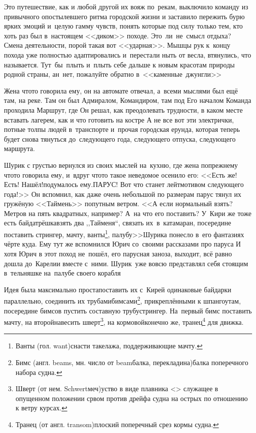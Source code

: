 {Это путешествие, как и любой другой их вояж по~рекам, выключило команду из привычного опостылевшего ритма городской жизни и заставило пережить бурю ярких эмоций и~целую гамму чувств, понять которые под силу только тем, кто хоть раз был в~настоящем <<диком>> походе. Это~ли~не~смысл отдыха? Смена деятельности, порой такая вот <<ударная>>. Мышцы рук к~концу похода уже полностью адаптировались и~перестали ныть от весла, втянулись, что называется. Тут~бы~плыть и~плыть себе дальше к новым красотам природы родной страны, ан~нет, пожалуйте обратно в~<<каменные~джунгли>>\myldots{}

Жена что\sdash то говорила ему, он на автомате отвечал, а~всеми мыслями был ещё там, на реке. Там он был Адмиралом, Командиром, там под Его началом Команда проходила Маршрут, где Он решал, как преодолевать трудности, в каком месте вставать лагерем, как и что готовить на костре\myldots{} А не все вот эти электрички, потные толпы людей в~транспорте и~прочая городская ерунда, которая теперь будет снова тянуться до~следующего года, следующего отпуска, следующего маршрута.

\renewcommand*{\thefootnote}{\arabic{footnote}}
\setcounter{footnote}{0}

Шурик с грустью вернулся из своих мыслей на~кухню, где жена по\sdash прежнему что\sdash то говорила ему, и~вдруг что\sdash то такое неведомое осенило его: <<Есть же! Есть! Нашёл!\mdash подумалось ему.\mdash ПАРУС! Вот что станет лейтмотивом следующего года!>> Он вспомнил, как даже очень небольшой по размерам парус тянул их гружёную <<Таймень>> попутным ветром. <<А если нормальный взять? Метров на пять квадратных, например? А~на что его поставить? У~Кири же тоже есть байда\sdash трёшка\mdash взять два ,,Тайменя``, связать их~в~катамаран, посередине поставить стрингер, мачту, ванты\footnote{Ванты (гол. want)\mdash снасти такелажа, поддерживающие мачту.}, палубу\myldots{}>>\mdash Шурика понесло в~его фантазиях чёрте куда. Ему тут же вспомнился Юрич со~своими рассказами про паруса\myldots{} И хотя Юрич в этот поход не~пошёл, его парусная заноза, выходит, всё равно дошла до~Карелии вместе с~ними. Шурик~уже вовсю представлял себя стоящим в~тельняшке на~палубе своего корабля\myldots{}%

Идея была максимально проста\mdash поставить их с~Кирей одинаковые  байдарки параллельно, соединить их трубами\sdash бимсами\footnote{Бимс (англ. beams, мн. число от beam\mdash балка, перекладина)\mdash балка поперечного набора судна.}, прикреплёнными к шпангоутам, посередине бимсов пустить составную трубу\sdash стрингер.
\renewcommand*{\thefootnote}{\arabic{footnote}}
\setcounter{footnote}{0}
На~первый бимс поставить мачту, на второй\mdash навесить шверт\footnote{Шверт (от нем. Schwert\mdash меч)\mdash уст\sdash во в виде плавника <\myldots{}> служащее в опущенном положении ср\sdash вом против дрейфа судна на острых по отношению к ветру курсах.}, на кормовой\mdash конечно же, транец\footnote{Транец (от англ. transom)\mdash плоский поперечный срез кормы судна.} для движка.



}

